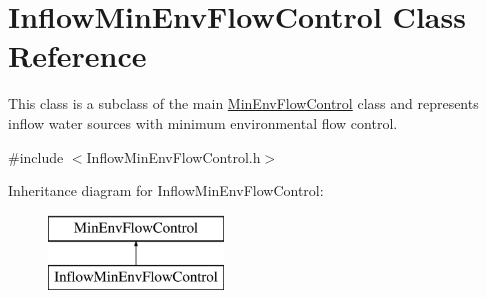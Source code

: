\hypertarget{classInflowMinEnvFlowControl}{}\section{Inflow\+Min\+Env\+Flow\+Control Class Reference}
\label{classInflowMinEnvFlowControl}


This class is a subclass of the main {\ttfamily \mbox{\hyperlink{classMinEnvFlowControl}{Min\+Env\+Flow\+Control}}} class and represents inflow water sources with minimum environmental flow control.  




{\ttfamily \#include $<$Inflow\+Min\+Env\+Flow\+Control.\+h$>$}

Inheritance diagram for Inflow\+Min\+Env\+Flow\+Control\+:\begin{figure}[H]
\begin{center}
\leavevmode
\includegraphics[height=2.000000cm]{classInflowMinEnvFlowControl}
\end{center}
\end{figure}
